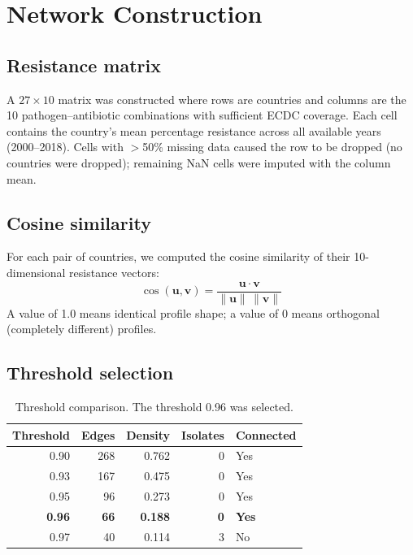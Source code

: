 \documentclass[12pt,a4paper]{article}
\begin{document}
\section{Network Construction}

\subsection*{Resistance matrix}

A $27 \times 10$ matrix was constructed where rows are countries and
columns are the 10 pathogen--antibiotic combinations with sufficient
ECDC coverage.
Each cell contains the country's mean percentage resistance across all
available years (2000--2018).
Cells with $>$50\% missing data caused the row to be dropped (no
countries were dropped); remaining NaN cells were imputed with the
column mean.

\subsection*{Cosine similarity}

For each pair of countries, we computed the cosine similarity of their
10-dimensional resistance vectors:
\[
  \cos(\mathbf{u}, \mathbf{v}) = \frac{\mathbf{u} \cdot \mathbf{v}}{\|\mathbf{u}\|\,\|\mathbf{v}\|}
\]
A value of 1.0 means identical profile shape; a value of 0 means
orthogonal (completely different) profiles.

\subsection*{Threshold selection}

\begin{table}[h]
\centering
\caption{Threshold comparison. The threshold 0.96 was selected.}
\label{tab:threshold}
\begin{tabular}{@{}rrrrl@{}}
\toprule
Threshold & Edges & Density & Isolates & Connected \\
\midrule
0.90 & 268 & 0.762 & 0 & Yes \\
0.93 & 167 & 0.475 & 0 & Yes \\
0.95 &  96 & 0.273 & 0 & Yes \\
\textbf{0.96} & \textbf{66} & \textbf{0.188} & \textbf{0} & \textbf{Yes} \\
0.97 &  40 & 0.114 & 3 & No  \\
\bottomrule
\end{tabular}
\end{table}
\end{document}
